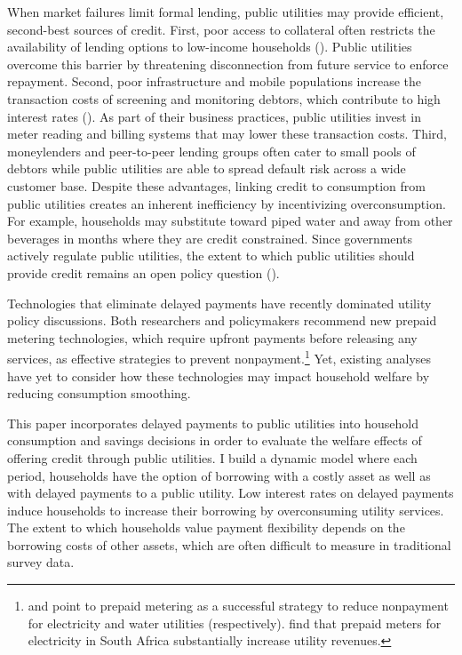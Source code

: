 \documentclass[12pt]{article}
\begin{document}
When market failures limit formal lending, public utilities may provide efficient, second-best sources of credit.  First, poor access to collateral often restricts the availability of lending options to low-income households (\cite{jack2016borrowing}).  Public utilities overcome this barrier by threatening disconnection from future service to enforce repayment.  Second, poor infrastructure and mobile populations increase the transaction costs of screening and monitoring debtors, which contribute to high interest rates (\cite{jack2014risk}).  As part of their business practices, public utilities invest in meter reading and billing systems that may lower these transaction costs.  Third, moneylenders and peer-to-peer lending groups often cater to small pools of debtors while public utilities are able to spread default risk across a wide customer base.  Despite these advantages, linking credit to consumption from public utilities creates an inherent inefficiency by incentivizing overconsumption.  For example, households may substitute toward piped water and away from other beverages in months where they are credit constrained.  Since governments actively regulate public utilities, the extent to which public utilities should provide credit remains an open policy question (\cite{laffont2005regulation}).  

Technologies that eliminate delayed payments have recently dominated utility policy discussions.    Both researchers and policymakers recommend new prepaid metering technologies, which require upfront payments before releasing any services, as effective strategies to prevent nonpayment.\footnote{\cite{kojima2016making} and \cite{heymans2014limits} point to prepaid metering as a successful strategy to reduce nonpayment for electricity and water utilities (respectively).  \cite{jack2016charging} find that prepaid meters for electricity in South Africa substantially increase utility revenues.}    Yet, existing analyses have yet to consider how these technologies may impact household welfare by reducing consumption smoothing.

This paper incorporates delayed payments to public utilities into household consumption and savings decisions in order to evaluate the welfare effects of offering credit through public utilities.  I build a dynamic model where each period, households have the option of borrowing with a costly asset as well as with delayed payments to a public utility.  Low interest rates on delayed payments induce households to increase their borrowing by overconsuming utility services.  The extent to which households value payment flexibility depends on the borrowing costs of other assets, which are often difficult to measure in traditional survey data.
\end{document}
